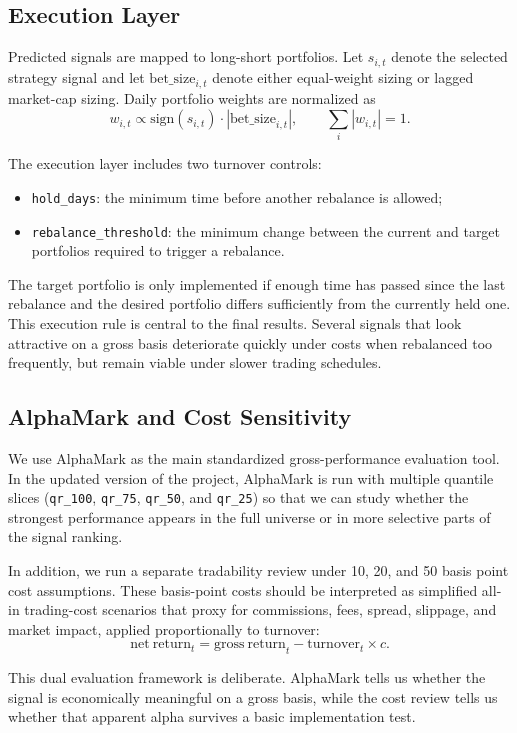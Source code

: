\subsection{Execution Layer}

Predicted signals are mapped to long-short portfolios. Let $s_{i,t}$ denote the selected strategy signal and let $\mathrm{bet\_size}_{i,t}$ denote either equal-weight sizing or lagged market-cap sizing. Daily portfolio weights are normalized as
\[
w_{i,t}
\propto
\mathrm{sign}(s_{i,t}) \cdot |\mathrm{bet\_size}_{i,t}|,
\qquad
\sum_i |w_{i,t}| = 1.
\]

The execution layer includes two turnover controls:
\begin{itemize}[leftmargin=1.4em]
  \item \texttt{hold\_days}: the minimum time before another rebalance is allowed;
  \item \texttt{rebalance\_threshold}: the minimum change between the current and target portfolios required to trigger a rebalance.
\end{itemize}

The target portfolio is only implemented if enough time has passed since the last rebalance and the desired portfolio differs sufficiently from the currently held one. This execution rule is central to the final results. Several signals that look attractive on a gross basis deteriorate quickly under costs when rebalanced too frequently, but remain viable under slower trading schedules.

\subsection{AlphaMark and Cost Sensitivity}

We use AlphaMark as the main standardized gross-performance evaluation tool. In the updated version of the project, AlphaMark is run with multiple quantile slices (\texttt{qr\_100}, \texttt{qr\_75}, \texttt{qr\_50}, and \texttt{qr\_25}) so that we can study whether the strongest performance appears in the full universe or in more selective parts of the signal ranking.

In addition, we run a separate tradability review under 10, 20, and 50 basis point cost assumptions. These basis-point costs should be interpreted as simplified all-in trading-cost scenarios that proxy for commissions, fees, spread, slippage, and market impact, applied proportionally to turnover:
\[
\mathrm{net\ return}_t
=
\mathrm{gross\ return}_t
-
\mathrm{turnover}_t \times c.
\]

This dual evaluation framework is deliberate. AlphaMark tells us whether the signal is economically meaningful on a gross basis, while the cost review tells us whether that apparent alpha survives a basic implementation test.
